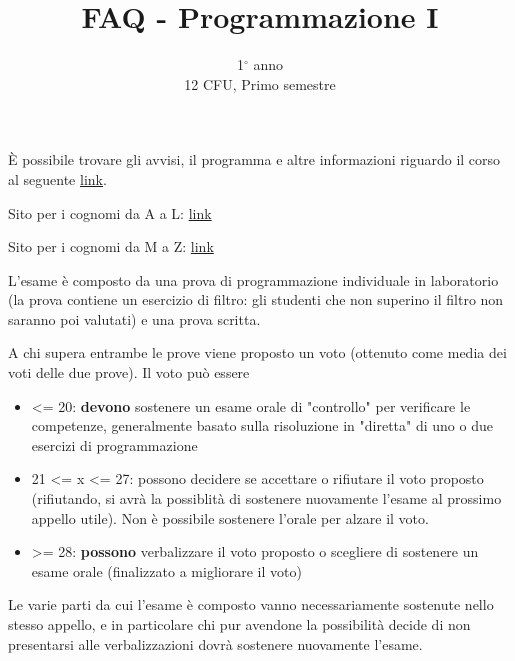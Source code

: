 \documentclass{article}
\title{FAQ - \textbf{Programmazione I}}
\author{
	1$^{\circ}$ anno\\12 CFU, Primo semestre\\
	\date{}
}
\begin{document}
 
	\maketitle
	
	\begin{QuestionList}
		
		 {
		    È possibile trovare gli avvisi, il programma e altre informazioni riguardo il corso al seguente \href{http://boldi.di.unimi.it/Corsi/Inf2020/}{link}.
		
		    Sito per i cognomi da A a L:
	        \href{https://atrentinip.ariel.ctu.unimi.it/}{link}
	        
	    	Sito per i cognomi da M a Z:
		    \href{https://mcasazzapud.ariel.ctu.unimi.it/}{link}
		}
		
		 {
		    L’esame è composto da una prova di programmazione individuale in laboratorio (la prova contiene un esercizio di filtro: gli studenti che non superino il filtro non saranno poi valutati) e una prova scritta. 
		    
		    A chi supera entrambe le prove viene proposto un voto (ottenuto come media dei voti delle due prove). Il voto può essere
		    \begin{itemize} 
		        \item <= 20: \textbf{devono} sostenere un esame orale di "controllo" per verificare le competenze, generalmente basato sulla risoluzione in "diretta" di uno o due esercizi di programmazione
		        
		        \item 21 <= x <= 27: possono decidere se accettare o rifiutare il voto proposto (rifiutando, si avrà la possiblità di sostenere nuovamente l'esame al prossimo appello utile). Non è possibile sostenere l'orale per alzare il voto.
		        
		        \item >= 28: \textbf{possono} verbalizzare il voto proposto o scegliere di sostenere un esame orale (finalizzato a migliorare il voto)
		    
		    \end{itemize}
		   
		    Le varie parti da cui l'esame è composto vanno necessariamente sostenute nello stesso appello, e in particolare chi pur avendone la possibilità decide di non presentarsi alle verbalizzazioni dovrà sostenere nuovamente l'esame.
		}
		

\end{QuestionList}
\end{document}
